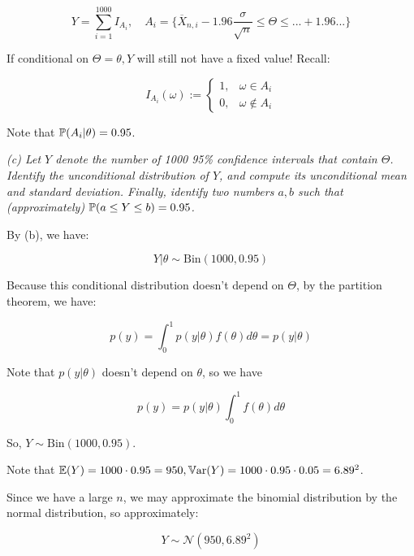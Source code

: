\documentclass[a4paper]{article}
\begin{document}
                \[
                    Y = \sum_{i=1}^{1000} I_{A_i}, \quad A_i =\{\overline
                    X_{n,i} - 1.96 \frac{\sigma}{\sqrt{n}} \leq \Theta \leq ...
                    + 1.96 ... \}
                \]

                If conditional on $\Theta = \theta, Y$ will still not have a
                fixed value! Recall:

                \[
                    I_{A_i}(\omega) := \begin{cases}1, & \omega \in A_i \\ 0, &
                    \omega \not \in A_i\end{cases}
                \]

                Note that $\mathbb{P}(A_i | \theta) = 0.95$.

            \textit{(c) Let $Y$ denote the number of 1000 95\% confidence
            intervals that contain $\Theta$. Identify the unconditional
            distribution of $Y$, and compute its unconditional mean and standard
            deviation. Finally, identify two numbers $a, b$ such that
            (approximately) $\mathbb{P}(a \leq Y \leq b) = 0.95$.}

                By (b), we have:

                \[
                    Y | \theta \sim \text{Bin}(1000, 0.95)
                \]

                Because this conditional distribution doesn't depend on
                $\Theta$, by the partition theorem, we have:

                \[
                    p(y) = \int_0^1 p(y | \theta) f(\theta) d\theta =
                    p(y | \theta)
                \]

                Note that $p(y | \theta)$ doesn't depend on $\theta$, so we have

                \[
                    p(y) = p(y | \theta) \int_0^1 f(\theta) d\theta
                \]

                So, $Y \sim \text{Bin}(1000, 0.95)$.

                Note that $\mathbb{E}(Y) = 1000 \cdot 0.95 = 950, \mathbb{V}\text{ar}(Y) = 1000 \cdot
                0.95 \cdot 0.05 = 6.89^2$.

                Since we have a large $n$, we may approximate the binomial
                distribution by the normal distribution, so approximately:

                \[
                    Y \sim \mathcal{N}(950, 6.89^2)
                \]
\end{document}
